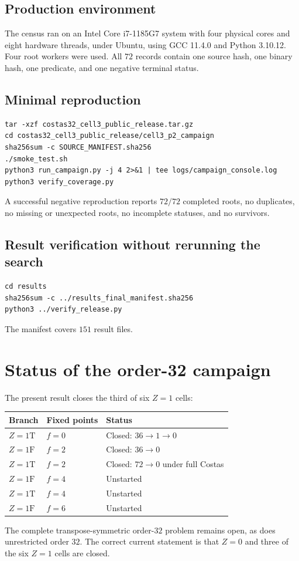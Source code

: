 \documentclass[11pt,a4paper]{article}
\theoremstyle{definition}\newtheorem{definition}[theorem]{Definition}
\theoremstyle{remark}\newtheorem{remark}[theorem]{Remark}
\begin{document}
\subsection{Production environment}
The census ran on an Intel Core i7-1185G7 system with four physical cores and eight hardware threads, under Ubuntu, using GCC 11.4.0 and Python 3.10.12. Four root workers were used. All $72$ records contain one source hash, one binary hash, one predicate, and one negative terminal status.

\subsection{Minimal reproduction}
\begin{verbatim}
tar -xzf costas32_cell3_public_release.tar.gz
cd costas32_cell3_public_release/cell3_p2_campaign
sha256sum -c SOURCE_MANIFEST.sha256
./smoke_test.sh
python3 run_campaign.py -j 4 2>&1 | tee logs/campaign_console.log
python3 verify_coverage.py
\end{verbatim}
A successful negative reproduction reports $72/72$ completed roots, no duplicates, no missing or unexpected roots, no incomplete statuses, and no survivors.

\subsection{Result verification without rerunning the search}
\begin{verbatim}
cd results
sha256sum -c ../results_final_manifest.sha256
python3 ../verify_release.py
\end{verbatim}
The manifest covers $151$ result files.

\section{Status of the order-32 campaign}
The present result closes the third of six $Z=1$ cells:
\begin{longtable}{@{}lll@{}}
\toprule Branch & Fixed points & Status\\\midrule
$Z=1\mathrm T$ & $f=0$ & Closed: $36\to1\to0$\\
$Z=1\mathrm F$ & $f=2$ & Closed: $36\to0$\\
$Z=1\mathrm T$ & $f=2$ & Closed: $72\to0$ under full Costas\\
$Z=1\mathrm F$ & $f=4$ & Unstarted\\
$Z=1\mathrm T$ & $f=4$ & Unstarted\\
$Z=1\mathrm F$ & $f=6$ & Unstarted\\\bottomrule
\end{longtable}
The complete transpose-symmetric order-$32$ problem remains open, as does unrestricted order $32$. The correct current statement is that $Z=0$ and three of the six $Z=1$ cells are closed.
\end{document}
